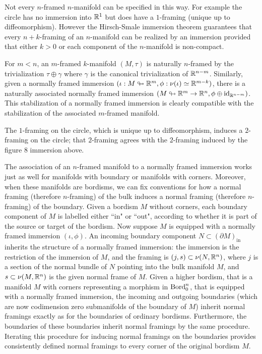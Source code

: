 \documentclass{amsart}
\begin{document}
\begin{remark}  %
Not every $n$-framed $n$-manifold can be specified in this way. For example the circle has no immersion into $\mathbb R^1$ but does have a $1$-framing (unique up to diffeomorphism). However the Hirsch-Smale immersion theorem guarantees that every $n+k$-framing of an $n$-manifold can be realized by an immersion provided that either $k > 0$ or each component of the $n$-manifold is non-compact. 
\end{remark}

For $m < n$, an $m$-framed $k$-manifold $(M,\tau)$ is naturally $n$-framed by the trivialization $\tau \oplus \gamma$ where $\gamma$ is the canonical trivialization of $\mathbb R^{n-m}$.  Similarly, given a normally framed immersion $(\iota: M \looparrowright \mathbb R^m, \phi: \nu(\iota) \simeq \mathbb R^{m-k})$, there is a naturally associated normally framed immersion $(M \looparrowright \mathbb R^m \rightarrow \mathbb R^n, \phi \oplus \mathrm{id}_{\mathbb R^{n-m}})$.  This stabilization of a normally framed immersion is clearly compatible with the stabilization of the associated $m$-framed manifold.

\begin{example}
The $1$-framing on the circle, which is unique up to diffeomorphism, induces a $2$-framing on the circle; that $2$-framing agrees with the $2$-framing induced by the figure 8 immersion above. 
\end{example}

The association of an $n$-framed manifold to a normally framed immersion works just as well for manifolds with boundary or manifolds with corners.  Moreover, when these manifolds are bordisms, we can fix conventions for how a normal framing (therefore $n$-framing) of the bulk induces a normal framing (therefore $n$-framing) of the boundary.  Given a bordism $M$ without corners, each boundary component of $M$ is labelled either ``in" or ``out", according to whether it is part of the source or target of the bordism.  Now suppose $M$ is equipped with a normally framed immersion $(\iota,\phi)$.  An incoming boundary component $N \subset (\partial M)_{\textrm{in}}$ inherits the structure of a normally framed immersion: the immersion is the restriction of the immersion of $M$, and the framing is $(j, s) \subset \nu(N,\mathbb R^n)$, where $j$ is a section of the normal bundle of $N$ pointing into the bulk manifold $M$, and $s \subset \nu(M,\mathbb R^n)$ is the given normal frame of $M$.  Given a higher bordism, that is a manifold $M$ with corners representing a morphism in $\mathrm{Bord}_0^n$, that is equipped with a normally framed immersion, the incoming and outgoing boundaries (which are now codimension zero submanifolds of the boundary of $M$) inherit normal framings exactly as for the boundaries of ordinary bordisms.  Furthermore, the boundaries of these boundaries inherit normal framings by the same procedure.  Iterating this procedure for inducing normal framings on the boundaries provides consistently defined normal framings to every corner of the original bordism $M$.
\end{document}
